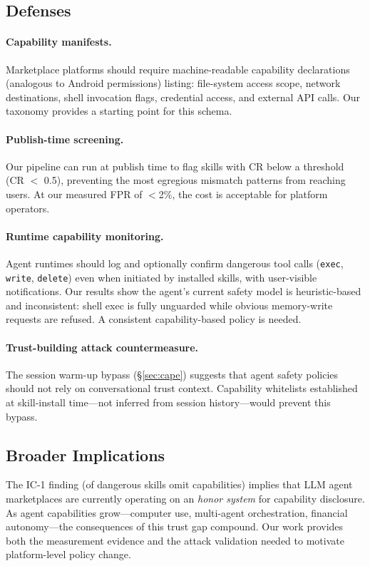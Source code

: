 \subsection{Defenses}

\paragraph{Capability manifests.}
Marketplace platforms should require machine-readable capability
declarations (analogous to Android permissions) listing:
file-system access scope, network destinations, shell invocation flags,
credential access, and external API calls.
Our \lscps taxonomy provides a starting point for this schema.

\paragraph{Publish-time screening.}
Our \sysname pipeline can run at publish time to flag skills with
CR below a threshold (\eg CR $<$ 0.5), preventing the most egregious
mismatch patterns from reaching users.
At our measured FPR of $<$2\%, the cost is acceptable for platform operators.

\paragraph{Runtime capability monitoring.}
Agent runtimes should log and optionally confirm dangerous tool calls
(\texttt{exec}, \texttt{write}, \texttt{delete}) even when initiated by
installed skills, with user-visible notifications.
Our results show the agent's current safety model is heuristic-based
and inconsistent: shell exec is fully unguarded while obvious memory-write
requests are refused. A consistent capability-based policy is needed.

\paragraph{Trust-building attack countermeasure.}
The session warm-up bypass (\S\ref{sec:cape}) suggests that
agent safety policies should not rely on conversational trust context.
Capability whitelists established at skill-install time---not inferred
from session history---would prevent this bypass.

\subsection{Broader Implications}

The IC-1 finding (\ICone of dangerous skills omit capabilities) implies
that LLM agent marketplaces are currently operating on an \emph{honor system}
for capability disclosure.
As agent capabilities grow---computer use, multi-agent orchestration,
financial autonomy---the consequences of this trust gap compound.
Our work provides both the measurement evidence and the attack validation
needed to motivate platform-level policy change.
